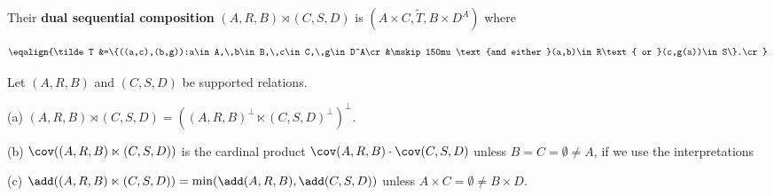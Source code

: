 
\noindent Their {\bf dual sequential composition}
$(A,R,B)\rtimes(C,S,D)$ is $(A\times C,\tilde T,B\times D^A)$ where

$$\eqalign{\tilde T
&=\{((a,c),(b,g)):a\in A,\,b\in B,\,c\in C,\,g\in D^A\cr
&\mskip150mu
  \text{and either }(a,b)\in R\text{ or }(c,g(a))\in S\}.\cr}$$

 Let $(A,R,B)$ and $(C,S,D)$ be supported
relations.

(a)
$(A,R,B)\rtimes(C,S,D)=((A,R,B)^{\perp}\ltimes(C,S,D)^{\perp})^{\perp}$.

(b) $\cov((A,R,B)\ltimes(C,S,D))$ is the cardinal product
$\cov(A,R,B)\cdot\cov(C,S,D)$ unless
$B=C=\emptyset\ne A$, if we use the interpretations


(c) $\add((A,R,B)\ltimes(C,S,D))=\min(\add(A,R,B),\add(C,S,D))$ unless
$A\times C=\emptyset\ne B\times D$.

